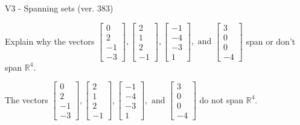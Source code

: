 \begin{exercise}
  \begin{exerciseTitle}V3 - Spanning sets (ver. 383)\end{exerciseTitle}
  \begin{exerciseStatement}
    Explain why the vectors \(\left[\begin{array}{r}
0 \\
2 \\
-1 \\
-3
\end{array}\right] , \left[\begin{array}{r}
2 \\
1 \\
2 \\
-1
\end{array}\right] , \left[\begin{array}{r}
-1 \\
-4 \\
-3 \\
1
\end{array}\right] , \text{ and } \left[\begin{array}{r}
3 \\
0 \\
0 \\
-4
\end{array}\right]\) span or don't span \(\mathbb{R}^4\). 
	


  \end{exerciseStatement}
  \begin{exerciseAnswer}
   The vectors \(\left[\begin{array}{r}
0 \\
2 \\
-1 \\
-3
\end{array}\right] , \left[\begin{array}{r}
2 \\
1 \\
2 \\
-1
\end{array}\right] , \left[\begin{array}{r}
-1 \\
-4 \\
-3 \\
1
\end{array}\right] , \text{ and } \left[\begin{array}{r}
3 \\
0 \\
0 \\
-4
\end{array}\right]\) 
  	 do not  
	span \(\mathbb{R}^4\).
  


  \end{exerciseAnswer}
\end{exercise}